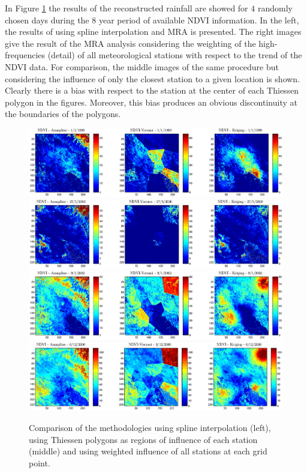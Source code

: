 \documentclass[10pt,letterpaper,conference]{ieeeconf}
\begin{document}
In Figure \ref{fig:3methodsComparison} the results of the reconstructed 
rainfall are showed for $4$ randomly chosen days during the $8$ year 
period of available NDVI information. In the left, the results of using spline 
interpolation and MRA is presented. The right images give the result of the 
MRA analysis considering the weighting of the high-frequencies (detail) of all 
meteorological stations with respect to the trend of the NDVI data. For 
comparison, the middle images of the same procedure but considering the 
influence of only the closest station to a given location is shown. Clearly 
there is a bias with respect to the station at the center of each Thiessen 
polygon in the figures. Moreover, this bias produces an obvious discontinuity 
at the boundaries of the polygons.  
\begin{figure}[ht]
\begce
\includegraphics[width=\columnwidth]{ComparisonNDVIscaling1_1_1999}\\
\includegraphics[width=\columnwidth]{ComparisonNDVIscaling27_5_2000}\\ 
\includegraphics[width=\columnwidth]{ComparisonNDVIscaling9_1_2002}\\
\includegraphics[width=\columnwidth]{ComparisonNDVIscaling6_12_2006}
\endce
\caption{Comparison of the methodologies using spline interpolation (left), 
using Thiessen polygons as regions of influence of each station (middle) and 
using weighted influence of all stations at each grid point.}
\label{fig:3methodsComparison}
\end{figure}
\end{document}
